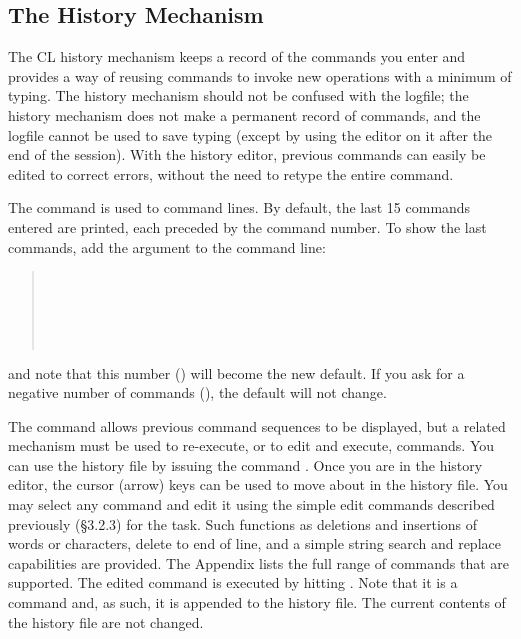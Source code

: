 \subsection{The History Mechanism}

\ppind
The CL history mechanism keeps a record of the commands you enter and
provides a way of reusing commands to invoke new operations with a minimum of
typing. The history mechanism should not be confused with the logfile;
the history mechanism does not make a permanent record of commands, 
and the logfile cannot be used to save typing 
(except by using the editor on it after the end of the session). 
With the history editor, previous commands can easily
be edited to correct errors, without the need to retype the entire command.

The  command is used to  command lines.
By default, the last 15 commands entered are printed, each preceded by
the command number.  To show the last  commands, 
add the argument  to the  command line:

\begin{quotation}\noindent
{}  \\
 \\
 \\
 \\
\end{quotation}

\noindent
and note that this number () will become the new default. 
If you ask for a negative number of commands (), 
the default will not change.

The  command allows previous command sequences to be
displayed, but a related mechanism must be used to re-execute, or to
edit and execute, commands. You can use the history file  
by issuing the command . Once you are in the history editor,
the cursor (arrow) keys can be used to move about in the history file. You
may select any command and edit it using the simple edit commands described
previously (\S 3.2.3) for the  task. Such functions as
deletions and insertions of words or characters, delete to end of line, and
a simple string search and replace capabilities are provided. 
The Appendix lists the full range of commands that are supported. 
The edited command is executed by hitting
. Note that it is a  command and, as such, it is
appended to the history file. The current contents of the history file
are not changed.

